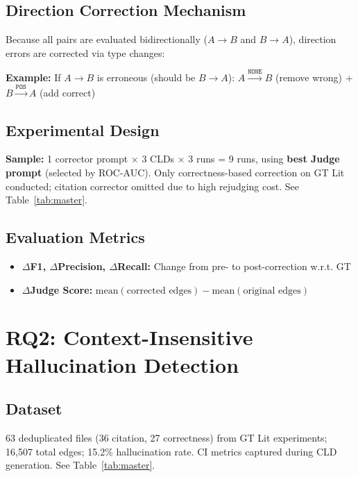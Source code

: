 \subsection{Direction Correction Mechanism}
Because all pairs are evaluated bidirectionally ($A \rightarrow B$ and $B \rightarrow A$), direction errors are corrected via type changes:

\textbf{Example:} If $A \rightarrow B$ is erroneous (should be $B \rightarrow A$):
$A \xrightarrow{\texttt{NONE}} B$ (remove wrong) + $B \xrightarrow{\texttt{POS}} A$ (add correct)

\subsection{Experimental Design}
\textbf{Sample:} 1 corrector prompt $\times$ 3 CLDs $\times$ 3 runs = 9 runs, using \textbf{best Judge prompt} (selected by ROC-AUC). Only correctness-based correction on GT Lit conducted; citation corrector omitted due to high rejudging cost. See Table~\ref{tab:master}.

\subsection{Evaluation Metrics}
\begin{itemize}[noitemsep]
    \item \textbf{$\Delta$F1, $\Delta$Precision, $\Delta$Recall:} Change from pre- to post-correction w.r.t. GT
    \item \textbf{$\Delta$Judge Score:} $\text{mean}(\text{corrected edges}) - \text{mean}(\text{original edges})$
\end{itemize}

\section{RQ2: Context-Insensitive Hallucination Detection}

\subsection{Dataset}
63 deduplicated files (36 citation, 27 correctness) from GT Lit experiments; 16,507 total edges; 15.2\% hallucination rate. CI metrics captured during CLD generation. See Table~\ref{tab:master}.

